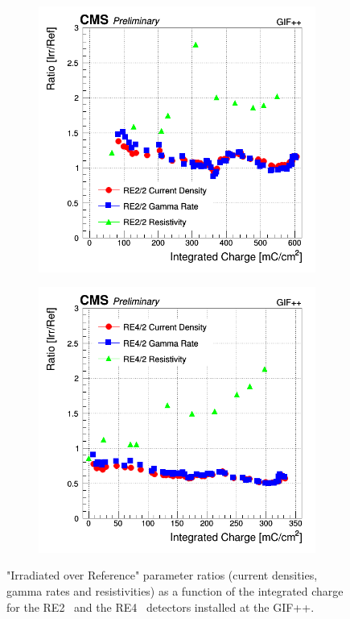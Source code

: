 	\begin{figure}[H]
    	\begin{subfigure}{0.5\linewidth}
    		\centering
			\includegraphics[width = \linewidth]{fig/chapt5/RE2-2-Source-Ratios-vs-Time-9600.png}
        	\caption{\label{fig:GIFpp-Ratios-mon:A}}
    	\end{subfigure}
    	\begin{subfigure}{0.5\linewidth}
			\centering
    		\includegraphics[width = \linewidth]{fig/chapt5/RE4-2-Source-Ratios-vs-Time-9500.png}
        	\caption{\label{fig:GIFpp-Ratios-mon:B}}
    	\end{subfigure}
		\caption{\label{fig:GIFpp-Ratios-mon} "Irradiated over Reference" parameter ratios (current densities, gamma rates and resistivities) as a function of the integrated charge for the RE2~ and the RE4~ detectors installed at the GIF++.}
	\end{figure}
	

